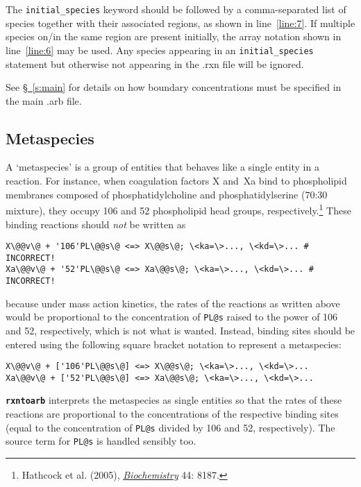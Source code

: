 \documentclass[fontsize=12pt,
               captions=abovetable,
               numbers=noenddot,
              ]{scrartcl}
\newcommand{\sect}[1]{\hyperref[s:#1]{\S~\ref{s:#1}}}
\newcommand{\rxntoarb}{\texttt{\textbf{rxntoarb}}}
\newcommand{\syntax}[2]{\textcolor{#1}{\texttt{#2}}}
\newcommand{\lnum}[1]{line~\ref{line:#1}}
\begin{document}
The \syntax{statement}{initial\_species} keyword should be followed by a comma-separated list of species together with their associated regions, as shown in \lnum{7}. If multiple species on\slash{}in the same region are present initially, the array notation shown in \lnum{6} may be used. Any species appearing in an \syntax{statement}{initial\_species} statement but otherwise not appearing in the .rxn file will be ignored. 

See \sect{main} for details on how boundary concentrations must be specified in the main .arb file.

\subsection{Metaspecies \label{s:metaspecies}}

A `metaspecies' is a group of entities that behaves like a single entity in a reaction. For instance, when coagulation factors X and~Xa bind to phospholipid membranes composed of phosphatidylcholine and phosphatidylserine (70:30 mixture), they occupy 106 and 52 phospholipid head groups, respectively.\footnote{Hathcock et al. (2005), \emph{\href{http://dx.doi.org/10.1021/bi050338b}{Biochemistry}} 44: 8187.} These binding reactions should \emph{not} be written as
%
\begingroup
\let\thelstnumber\relax
\begin{lstlisting}
X\@@v\@ + '106'PL\@@s\@ <=> X\@@s\@; \<ka=\>..., \<kd=\>... # INCORRECT!
Xa\@@v\@ + '52'PL\@@s\@ <=> Xa\@@s\@; \<ka=\>..., \<kd=\>... # INCORRECT!
\end{lstlisting}
\endgroup
%
\noindent{}because under mass action kinetics, the rates of the reactions as written above would be proportional to the concentration of \texttt{PL}\syntax{special}{@s} raised to the power of 106 and 52, respectively, which is not what is wanted. Instead, binding sites should be entered using the following square bracket notation to represent a metaspecies:
%
\begingroup
\let\thelstnumber\relax
\begin{lstlisting}
X\@@v\@ + ['106'PL\@@s\@] <=> X\@@s\@; \<ka=\>..., \<kd=\>...
Xa\@@v\@ + ['52'PL\@@s\@] <=> Xa\@@s\@; \<ka=\>..., \<kd=\>...
\end{lstlisting}
\endgroup
%
\noindent{}\rxntoarb{} interprets the metaspecies as single entities so that the rates of these reactions are proportional to the concentrations of the respective binding sites (equal to the concentration of \texttt{PL}\syntax{special}{@s} divided by 106 and 52, respectively). The source term for \texttt{PL}\syntax{special}{@s} is handled sensibly too.
\end{document}
